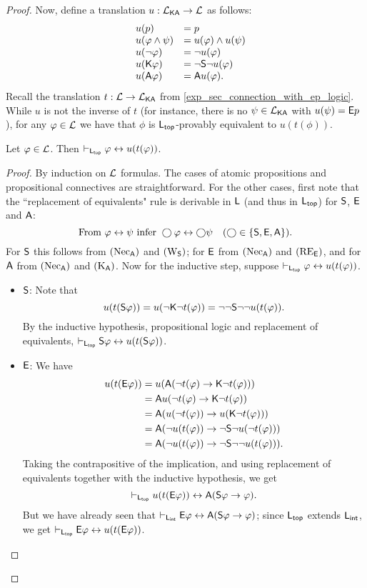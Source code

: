 \begin{proof}
Now, define a translation $u: \cLKA \to \cL$ as follows:
\[
\begin{array}{lll}
 &u(p) &= p \\
 &u(\phi \land \psi) &= u(\phi) \land u(\psi) \\
 &u(\neg\phi) &= \neg u(\phi) \\
 &u(\K\phi) &= \neg\S\neg u(\phi) \\
 &u(\A\phi) &= \A u(\phi).
\end{array}\]
Recall the translation $t: \cL \to \cLKA$ from
\cref{exp_sec_connection_with_ep_logic}. While $u$ is not the inverse of $t$ (for
instance, there is no $\psi \in \cLKA$ with $u(\psi) = \E p$), for any $\phi
\in \cL$ we have that $\phi$ is $\sLtop$-provably equivalent to $u(t(\phi))$.

\begin{claim}
\label{exp_claim_ut_equivalence}
Let $\phi \in \cL$. Then $\entails_{\sLtop}
\phi \liff u(t(\phi))$.
\end{claim}

\begin{proof}

By induction on $\cL$ formulas. The cases of atomic
propositions and propositional connectives are straightforward. For
the other cases, first note that the ``replacement of equivalents"
rule is derivable in $\sL$ (and thus in $\sLtop$) for
$\S$, $\E$ and $\A$:
\[
    \text{From } \phi \liff \psi \text{ infer } \bigcirc\phi \liff
    \bigcirc\psi \quad (\bigcirc \in \{\S, \E, \A\}).
\]
For $\S$ this follows from $\necuniv$ and $\weakeningS$; for $\E$ from
$\necuniv$ and $\reE$, and for $\A$ from $\necuniv$ and $\Kuniv$. Now for the
inductive step, suppose $\entails_{\sLtop} \phi \liff u(t(\phi))$.

\begin{itemize}
    \item $\S$: Note that
        \[
        u(t(\S\phi))
= u(\neg\K\neg t(\phi))
= \neg\neg\S\neg\neg u(t(\phi)).\]
        By the inductive hypothesis, propositional logic and replacement
of equivalents, $\entails_{\sLtop} \S\phi \liff
u(t(\S\phi))$.

        \item $\E$: We have
        \[
        \begin{aligned}
   u(t(\E\phi))
   &= u(\A(\neg t(\phi) \limplies \K\neg t(\phi))) \\
   &= \A u(\neg t(\phi) \limplies \K\neg t(\phi)) \\
   &= \A (u(\neg t(\phi)) \limplies u(\K\neg t(\phi))) \\
   &= \A (\neg u(t(\phi)) \limplies \neg\S\neg u(\neg t(\phi))) \\
   &= \A (\neg u(t(\phi)) \limplies \neg\S\neg \neg u(t(\phi))).
\end{aligned}\]
        Taking the contrapositive of the implication, and using
replacement of equivalents together with the inductive hypothesis,
we get
        \[
        \entails_{\sLtop} u(t(\E\phi))
    \liff
    \A(
       \S\phi \limplies \phi
    ).\]
        But we have already seen that $\entails_{\sLint} \E\phi
\liff \A(\S\phi \limplies \phi)$; since $\sLtop$ extends
$\sLint$, we get $\entails_{\sLtop} \E\phi \liff
u(t(\E\phi))$.


\end{itemize}
\end{proof}
\end{proof}
